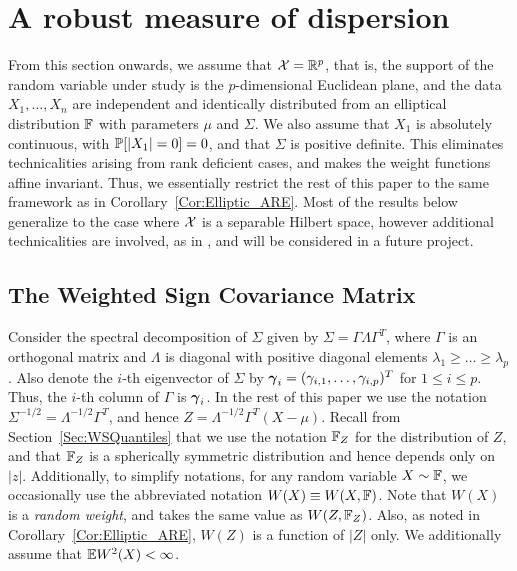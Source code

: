 \section{A robust measure of dispersion} 
\label{Sec:WSDispersion1}
From this section onwards, we assume that $\mathcal{X} = {\mathbb{R}}^{p}$, that is, the support of the 
random variable under study is the $p$-dimensional Euclidean plane, and the data 
$X_{1}, \ldots, X_{n}$ are independent and identically distributed from an 
elliptical distribution ${\mathbb{F}}$ with parameters $\mu$ and $\Sigma$.  We also 
assume that $X_{1}$ is absolutely continuous, with ${\mathbb{P}} [ | X_{1}| = 0] = 0$, 
and that $\Sigma$ is positive definite. This eliminates technicalities arising from rank deficient cases, and makes the weight functions affine invariant.
Thus, we essentially restrict the rest of this paper to the same  framework as in Corollary~\ref{Cor:Elliptic_ARE}. 
Most of the results below generalize to the case where 
$\mathcal{X}$ is a separable Hilbert space, however additional technicalities are involved, as in 
\cite{ref:AoS112852_Balietal_PCA_Functional_Robust}, and will be considered 
in a future project. 

\subsection{The Weighted Sign Covariance Matrix}
Consider the spectral decomposition of $\Sigma$ given by
 $\Sigma = \Gamma\Lambda\Gamma^T$, where $\Gamma$ is an orthogonal matrix 
 and $\Lambda$ is diagonal with positive diagonal elements $\lambda_1 \geq \ldots \geq 
 \lambda_p$.
Also denote the $i$-th eigenvector of $\Sigma$ by 
${\boldsymbol{\gamma}}_{i} = (\gamma_{i, 1}, \ldots, \gamma_{i, p})^T$ for $1 \leq i \leq p$. Thus, the 
$i$-th column of $\Gamma$ is ${\boldsymbol{\gamma}}_{i}$.
  In the rest of this paper we use the notation 
 $\Sigma^{-1/2} = \Lambda^{-1/2} \Gamma^{T}$, and 
 hence $Z = \Lambda^{-1/2} \Gamma^T (X - \mu)$. 
Recall from Section~\ref{Sec:WSQuantiles} that we use the notation ${\mathbb{F}}_{Z}$ for 
the distribution of $Z$, and that ${\mathbb{F}}_{Z}$ is a spherically symmetric distribution 
and hence depends only on $|z|$.
Additionally, to simplify notations, for any random variable $X \sim {\mathbb{F}}$, we occasionally 
use the abbreviated notation $W (X) \equiv W (X, {\mathbb{F}})$. Note that $W (X)$ is a 
\textit{random weight}, and takes the same value as $W (Z, {\mathbb{F}}_{Z})$.  
Also, as noted in  Corollary~\ref{Cor:Elliptic_ARE}, 
 $W (Z)$ is a function of $|Z|$ only. 
 We additionally assume that ${\mathbb{E}} W^{2} (X) < \infty$.
 
